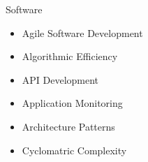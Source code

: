 \begin{multicols*}{3}
\vspace*{-0.3 in}
\Competencies
{Software}
{\begin{itemize}
    \item Agile Software Development
    \item Algorithmic Efficiency
    \item API Development
    \item Application Monitoring
    \item Architecture Patterns
    \item Cyclomatric Complexity
\end{itemize}}
\end{multicols*}
